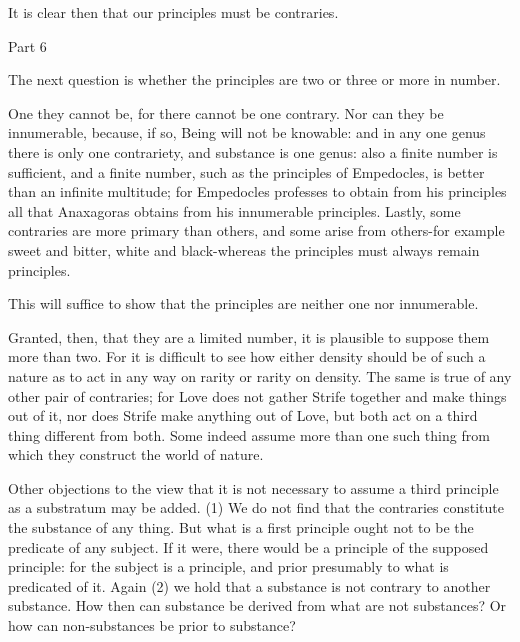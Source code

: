 It is clear then that our principles must be contraries.

Part 6

The next question is whether the principles are two or three or more
in number. 

One they cannot be, for there cannot be one contrary. Nor can they
be innumerable, because, if so, Being will not be knowable: and in
any one genus there is only one contrariety, and substance is one
genus: also a finite number is sufficient, and a finite number, such
as the principles of Empedocles, is better than an infinite multitude;
for Empedocles professes to obtain from his principles all that Anaxagoras
obtains from his innumerable principles. Lastly, some contraries are
more primary than others, and some arise from others-for example sweet
and bitter, white and black-whereas the principles must always remain
principles. 

This will suffice to show that the principles are neither one nor
innumerable. 

Granted, then, that they are a limited number, it is plausible to
suppose them more than two. For it is difficult to see how either
density should be of such a nature as to act in any way on rarity
or rarity on density. The same is true of any other pair of contraries;
for Love does not gather Strife together and make things out of it,
nor does Strife make anything out of Love, but both act on a third
thing different from both. Some indeed assume more than one such thing
from which they construct the world of nature. 

Other objections to the view that it is not necessary to assume a
third principle as a substratum may be added. (1) We do not find that
the contraries constitute the substance of any thing. But what is
a first principle ought not to be the predicate of any subject. If
it were, there would be a principle of the supposed principle: for
the subject is a principle, and prior presumably to what is predicated
of it. Again (2) we hold that a substance is not contrary to another
substance. How then can substance be derived from what are not substances?
Or how can non-substances be prior to substance? 

